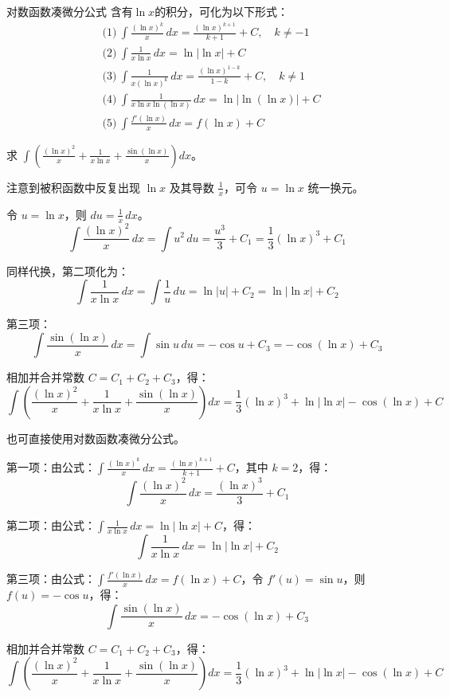 \begin{theorem}{对数函数凑微分公式}{}
  含有$\ln x$的积分，可化为以下形式：
  \[
\begin{aligned}
&\text{(1)}\ \int \frac{(\ln x)^k}{x} \,dx = \frac{(\ln x)^{k+1}}{k+1}+C, \quad k\neq -1 \\[4pt]
&\text{(2)}\ \int \frac{1}{x\ln x} \,dx = \ln|\ln x|+C \\[4pt]
&\text{(3)}\ \int \frac{1}{x(\ln x)^k} \,dx = \frac{(\ln x)^{1-k}}{1-k}+C, \quad k\neq 1 \\[4pt]
&\text{(4)}\ \int \frac{1}{x\ln x\ln(\ln x)} \,dx = \ln|\ln(\ln x)|+C \\[4pt]
&\text{(5)}\ \int \frac{f'(\ln x)}{x} \,dx = f(\ln x)+C
\end{aligned}
\]
\end{theorem}

\begin{myexample}
  求 $\int ( \frac{(\ln x)^2}{x} + \frac{1}{x\ln x} + \frac{\sin(\ln x)}{x} ) dx$。

  注意到被积函数中反复出现 $\ln x$ 及其导数 $\frac{1}{x}$，可令 $u = \ln x$ 统一换元。

令 $u = \ln x$，则 $du = \frac{1}{x}\,dx$。
    \[
    \int \frac{(\ln x)^2}{x}\,dx = \int u^2\,du = \frac{u^3}{3} + C_1 = \frac{1}{3}(\ln x)^3 + C_1
    \]

同样代换，第二项化为：
    \[
    \int \frac{1}{x\ln x}\,dx = \int \frac{1}{u}\,du = \ln|u| + C_2 = \ln|\ln x| + C_2
    \]

第三项：
    \[
    \int \frac{\sin(\ln x)}{x}\,dx = \int \sin u\,du = -\cos u + C_3 = -\cos(\ln x) + C_3
    \]

  相加并合并常数 $C = C_1+C_2+C_3$，得：
  \[
  \int ( \frac{(\ln x)^2}{x} + \frac{1}{x\ln x} + \frac{\sin(\ln x)}{x} ) dx
  = \frac{1}{3}(\ln x)^3 + \ln|\ln x| - \cos(\ln x) + C
  \]

  也可直接使用对数函数凑微分公式。

第一项：由公式：$\int \frac{(\ln x)^k}{x} \,dx = \frac{(\ln x)^{k+1}}{k+1}+C$，其中 $k=2$，得：
    \[
    \int \frac{(\ln x)^2}{x}\,dx = \frac{(\ln x)^{3}}{3} + C_1
    \]

第二项：由公式：$\int \frac{1}{x\ln x} \,dx = \ln|\ln x|+C$，得：
    \[
    \int \frac{1}{x\ln x}\,dx = \ln|\ln x| + C_2
    \]

第三项：由公式：$\int \frac{f'(\ln x)}{x} \,dx = f(\ln x)+C$，令 $f'(u)=\sin u$，则 $f(u)=-\cos u$，得：
    \[
    \int \frac{\sin(\ln x)}{x}\,dx = -\cos(\ln x) + C_3
    \]

  相加并合并常数 $C = C_1+C_2+C_3$，得：
  \[
  \int ( \frac{(\ln x)^2}{x} + \frac{1}{x\ln x} + \frac{\sin(\ln x)}{x} ) dx
  = \frac{1}{3}(\ln x)^3 + \ln|\ln x| - \cos(\ln x) + C
  \]
\end{myexample}


